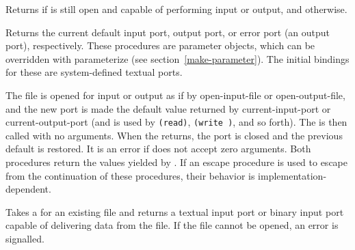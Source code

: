 \begin{entry}{%
}

Returns \schtrue{} if  is still open and capable of
performing input or output, and \schfalse{} otherwise.


\end{entry}


\begin{entry}{%
}

Returns the current default input port, output port, or error port (an
output port), respectively.  These procedures are parameter objects, which can be
overridden with {\cf parameterize} (see
section~\ref{make-parameter}). The initial bindings for these
are system-defined textual ports.

\end{entry}


\begin{entry}{%
}

The file is opened for input or output
as if by {\cf open-input-file} or {\cf open-output-file}, 
and the new port is made the default value returned by
{\cf current-input-port} or {\cf current-output-port}
(and is used by {\tt (read)}, {\tt (write )}, and so forth).
The  is then called with no arguments.  When the  returns,
the port is closed and the previous default is restored.
It is an error if  does not accept zero arguments.
Both procedures return the values yielded by .
If an escape procedure
is used to escape from the continuation of these procedures, their
behavior is implementation-dependent.


\end{entry}


\begin{entry}{%
}
 
Takes a  for an existing file and returns a textual
input port or binary input port capable of delivering data from the
file.  If the file cannot be opened, an error is signalled.

\end{entry}


